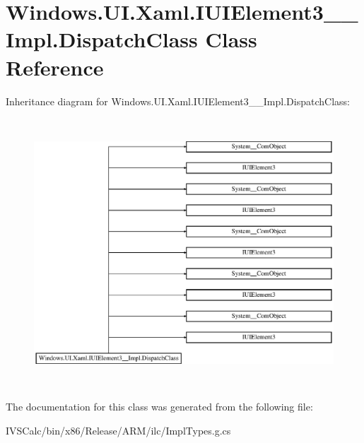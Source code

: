 \hypertarget{class_windows_1_1_u_i_1_1_xaml_1_1_i_u_i_element3_____impl_1_1_dispatch_class}{}\section{Windows.\+U\+I.\+Xaml.\+I\+U\+I\+Element3\+\_\+\+\_\+\+Impl.\+Dispatch\+Class Class Reference}
\label{class_windows_1_1_u_i_1_1_xaml_1_1_i_u_i_element3_____impl_1_1_dispatch_class}
Inheritance diagram for Windows.\+U\+I.\+Xaml.\+I\+U\+I\+Element3\+\_\+\+\_\+\+Impl.\+Dispatch\+Class\+:\begin{figure}[H]
\begin{center}
\leavevmode
\includegraphics[height=10.065359cm]{class_windows_1_1_u_i_1_1_xaml_1_1_i_u_i_element3_____impl_1_1_dispatch_class}
\end{center}
\end{figure}


The documentation for this class was generated from the following file\+:\begin{DoxyCompactItemize}
\item 
I\+V\+S\+Calc/bin/x86/\+Release/\+A\+R\+M/ilc/Impl\+Types.\+g.\+cs\end{DoxyCompactItemize}
